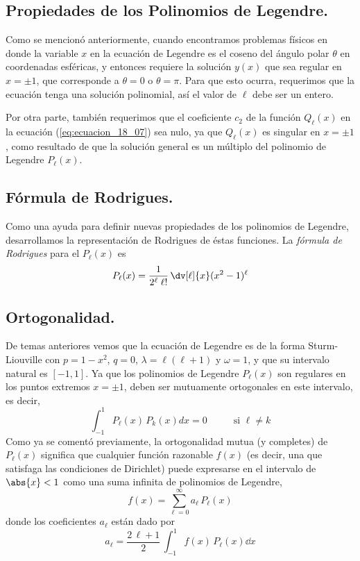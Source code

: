 \subsection{Propiedades de los Polinomios de Legendre.}
Como se mencionó anteriormente, cuando encontramos problemas físicos en donde la variable $x$ en la ecuación de Legendre es el coseno del ángulo polar $\theta$ en coordenadas esféricas, y entonces requiere la solución $y(x)$ que sea regular en $x = \pm 1$, que corresponde a $\theta = 0$ o $\theta = \pi$. Para que esto ocurra, requerimos que la ecuación tenga una solución polinomial, así el valor de $\ell$ debe ser un entero.
\par
Por otra parte, también requerimos que el coeficiente $c_{2}$ de la función $Q_{\ell}(x)$ en la ecuación (\ref{eq:ecuacion_18_07}) sea nulo, ya que $Q_{\ell}(x)$ es singular en $x = \pm 1$, como resultado de que la solución general es un múltiplo del polinomio de Legendre $P_{\ell}(x)$.
\subsection*{Fórmula de Rodrigues.}
Como una ayuda para definir nuevas propiedades de los polinomios de Legendre, desarrollamos la representación de Rodrigues de éstas funciones. La \emph{fórmula de Rodrigues} para el $P_{\ell} (x)$ es
\begin{equation}
P_{\ell} (x) = \dfrac{1}{2^{\ell} \; \ell !} \, \dv[\ell]{x}  (x^{2} - 1)^{\ell}
\label{eq:ecuacion_18_09}
\end{equation}
\subsection{Ortogonalidad.}
De temas anteriores vemos que la ecuación de Legendre es de la forma Sturm-Liouville con $p = 1 - x^{2}$, $q = 0$, $\lambda = \ell (\ell + 1)$ y $\omega = 1$, y que su intervalo natural es $[-1, 1 ]$. Ya que los polinomios de Legendre $P_{\ell} (x)$ son regulares en los puntos extremos $x = \pm 1$, deben ser mutuamente ortogonales en este intervalo, es decir,
\begin{equation}
\int_{-1}^{1} P_{\ell}(x) \, P_{k}(x) dx = 0 \hspace{1cm} \text{ si } \ell \neq k
\label{eq:ecuacion_18_12}
\end{equation}
Como ya se comentó previamente, la ortogonalidad mutua (y completes) de  $P_{\ell} (x)$ significa que cualquier función razonable $f(x)$ (es decir, una que satisfaga las condiciones de Dirichlet) puede expresarse en el intervalo de $\abs{x} <1$ como una suma infinita de polinomios de Legendre,
\begin{equation}
f(x) = \sum_{\ell = 0}^{\infty} a_{\ell} \, P_{\ell} (x)
\label{eq:ecuacion_18_13}
\end{equation}
donde los coeficientes $a_{\ell}$ están dado por
\begin{equation}
a_{\ell} = \dfrac{2 \, \ell + 1}{2} \, \int_{-1}^{1} f(x) \, P_{\ell} (x) \dd{x}
\label{eq:ecuacion_18_14}
\end{equation}
